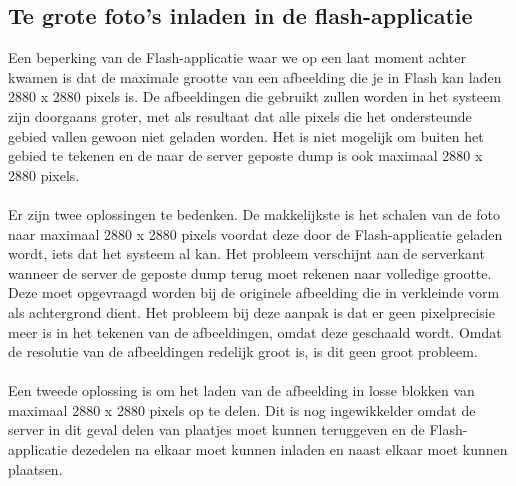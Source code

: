 \subsection{Te grote foto's inladen in de flash-applicatie} %
Een beperking van de Flash-applicatie waar we op een laat moment achter kwamen is dat de maximale grootte van een afbeelding die je in Flash kan laden 2880 x 2880 pixels is. De afbeeldingen die gebruikt zullen worden in het systeem zijn doorgaans groter, met als resultaat dat alle pixels die het ondersteunde gebied vallen gewoon niet geladen worden. Het is niet mogelijk om buiten het gebied te tekenen en de naar de server geposte dump is ook maximaal 2880 x 2880 pixels.
\\
\\
Er zijn twee oplossingen te bedenken. De makkelijkste is het schalen van de foto naar maximaal 2880 x 2880 pixels voordat deze door de Flash-applicatie geladen wordt, iets dat het systeem al kan. Het probleem verschijnt aan de serverkant wanneer de server de geposte dump terug moet rekenen naar volledige grootte. Deze moet opgevraagd worden bij de originele afbeelding die in verkleinde vorm als achtergrond dient. Het probleem bij deze aanpak is dat er geen pixelprecisie meer is in het tekenen van de afbeeldingen, omdat deze geschaald wordt. Omdat de resolutie van de afbeeldingen redelijk groot is, is dit geen groot probleem.
\\
\\
Een tweede oplossing is om het laden van de afbeelding in losse blokken van maximaal 2880 x 2880 pixels op te delen. Dit is nog ingewikkelder omdat de server in dit geval delen van plaatjes moet kunnen teruggeven en de Flash-applicatie dezedelen na elkaar moet kunnen inladen en naast elkaar moet kunnen plaatsen.

